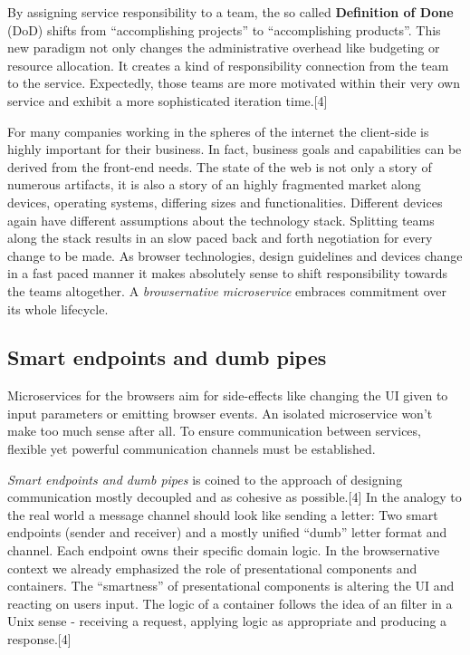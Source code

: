 \documentclass[]{assets/latex/ieee}
\begin{document}
By assigning service responsibility to a team, the so called
\textbf{Definition of Done} (DoD) shifts from ``accomplishing projects''
to ``accomplishing products''. This new paradigm not only changes the
administrative overhead like budgeting or resource allocation. It
creates a kind of responsibility connection from the team to the
service. Expectedly, those teams are more motivated within their very
own service and exhibit a more sophisticated iteration time.{[}4{]}

For many companies working in the spheres of the internet the
client-side is highly important for their business. In fact, business
goals and capabilities can be derived from the front-end needs. The
state of the web is not only a story of numerous artifacts, it is also a
story of an highly fragmented market along devices, operating systems,
differing sizes and functionalities. Different devices again have
different assumptions about the technology stack. Splitting teams along
the stack results in an slow paced back and forth negotiation for every
change to be made. As browser technologies, design guidelines and
devices change in a fast paced manner it makes absolutely sense to shift
responsibility towards the teams altogether. A \emph{browsernative
microservice} embraces commitment over its whole lifecycle.

\subsection{Smart endpoints and dumb
pipes}\label{smart-endpoints-and-dumb-pipes}

Microservices for the browsers aim for side-effects like changing the UI
given to input parameters or emitting browser events. An isolated
microservice won't make too much sense after all. To ensure
communication between services, flexible yet powerful communication
channels must be established.

\emph{Smart endpoints and dumb pipes} is coined to the approach of
designing communication mostly decoupled and as cohesive as
possible.{[}4{]} In the analogy to the real world a message channel
should look like sending a letter: Two smart endpoints (sender and
receiver) and a mostly unified ``dumb'' letter format and channel. Each
endpoint owns their specific domain logic. In the browsernative context
we already emphasized the role of presentational components and
containers. The ``smartness'' of presentational components is altering
the UI and reacting on users input. The logic of a container follows the
idea of an filter in a Unix sense - receiving a request, applying logic
as appropriate and producing a response.{[}4{]}
\end{document}

